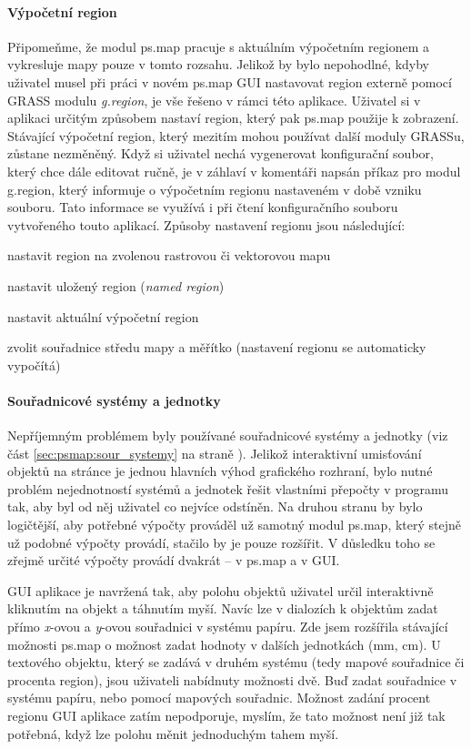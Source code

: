 \documentclass[a4paper,12pt,draft]{article}
\begin{document}
{\paragraph*{Výpočetní region} Připomeňme, že modul ps.map
pracuje s aktuálním výpočetním regionem a vykresluje mapy pouze v tomto
rozsahu. Jelikož by bylo nepohodlné, kdyby uživatel musel při práci v
novém ps.map GUI nastavovat region externě pomocí GRASS modulu
\emph{g.region}, je vše řešeno v rámci této aplikace. Uživatel si
v aplikaci určitým způsobem nastaví region, který pak ps.map
použije k zobrazení. Stávající výpočetní region, který mezitím
mohou používat další moduly GRASSu, zůstane nezměněný. Když si
uživatel nechá vygenerovat konfigurační soubor, který chce dále
editovat ručně, je v záhlaví v komentáři napsán příkaz pro modul
g.region, který informuje o výpočetním regionu nastaveném v době
vzniku souboru. Tato informace se využívá i při čtení konfiguračního
souboru vytvořeného touto aplikací.  Způsoby nastavení regionu jsou
následující:
\begin{enumerate*}
    \item nastavit region na zvolenou rastrovou či vektorovou mapu
    \item nastavit uložený region (\emph{named region})
    \item nastavit aktuální výpočetní region
    \item zvolit souřadnice středu mapy a měřítko (nastavení regionu
    se automaticky vypočítá)
\end{enumerate*}


\paragraph*{Souřadnicové systémy a jednotky} Nepříjemným problémem
byly používané souřadnicové systémy a jednotky (viz část
\ref{sec:psmap:sour_systemy} na straně \pageref{sec:psmap:sour_systemy}).
 Jelikož interaktivní umisťování objektů na stránce je jednou hlavních
 výhod grafického rozhraní, bylo nutné problém nejednotností systémů
 a jednotek řešit vlastními přepočty v programu tak, aby byl od něj
 uživatel co nejvíce odstíněn. Na druhou stranu by bylo logičtější,
 aby potřebné výpočty prováděl už samotný modul ps.map,
 který stejně už podobné výpočty provádí, stačilo by je pouze
 rozšířit. V důsledku toho se zřejmě určité výpočty provádí
 dvakrát -- v ps.map a v GUI.

 GUI aplikace je navržená tak, aby polohu objektů uživatel určil
 interaktivně kliknutím na objekt a táhnutím myší. Navíc lze
 v dialozích k objektům zadat přímo \emph{x}-ovou a \emph{y}-ovou
 souřadnici v systému papíru. Zde jsem rozšířila stávající možnosti
ps.map o možnost zadat hodnoty v dalších jednotkách (mm, cm).
 U textového objektu, který se zadává v druhém systému (tedy mapové
 souřadnice či procenta region), jsou uživateli nabídnuty možnosti
 dvě. Buď zadat souřadnice v systému papíru, nebo pomocí mapových
 souřadnic. Možnost zadání procent regionu GUI aplikace zatím nepodporuje,
 myslím, že tato možnost není již tak potřebná, když lze polohu
 měnit jednoduchým tahem myší.

}
\end{document}
